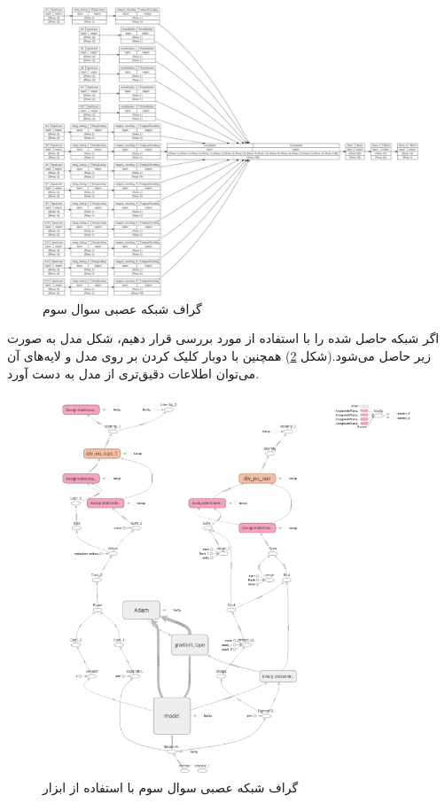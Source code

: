 \documentclass[12pt, a4paper]{article}
\begin{document}
\begin{figure}[h]
    \includegraphics[width=\linewidth]{images/model.png}
    \caption{گراف شبکه عصبی سوال سوم}
    \label{model}
\end{figure}

اگر شبکه حاصل شده را با استفاده از  مورد بررسی قرار دهیم، شکل مدل به صورت زیر حاصل
می‌شود.(شکل \ref{tensorboard_model}) همچنین با دوبار کلیک کردن بر روی مدل و لایه‌های آن می‌توان اطلاعات دقیق‌تری
از مدل به دست آورد.

\begin{figure}[h]
    \includegraphics[width=\linewidth]{images/tensorboard_model.png}
    \caption{گراف شبکه عصبی سوال سوم با استفاده از ابزار }
    \label{tensorboard_model}
\end{figure}
\end{document}
